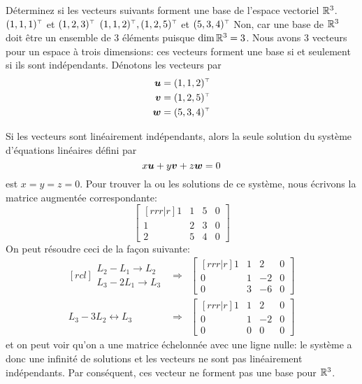 \begin{exemple}
Déterminez si les vecteurs suivants forment une base de l'espace vectoriel $\mathbb{R}^3$.
 $\transp{(1, 1, 1)}$ et $\transp{(1, 2, 3)}$
 $\transp{(1, 1, 2)}, \transp{(1, 2, 5)}$ et $\transp{(5, 3, 4)}$
\solution
{} Non, car une base de $\mathbb{R}^3$ doit être un ensemble de 3 éléments puisque $\dim\mathbb{R}^3 = 3$.
Nous avons 3 vecteurs pour un espace à trois dimensions: 
ces vecteurs forment une base si et seulement si ils sont indépendants.  
Dénotons les vecteurs par 
\begin{eqnarray*}
\mat{u} =  \transp{(1, 1, 2)}\\
\mat{v} =  \transp{(1, 2, 5)}\\
\mat{w} =  \transp{(5, 3, 4)}
\end{eqnarray*}

Si les vecteurs sont linéairement indépendants, alors la seule solution du système d'équations linéaires défini par
\[
x\boldsymbol{u} + y\boldsymbol{v} + z\boldsymbol{w} = 0
\]
est $x=y=z=0$.  Pour trouver la ou les solutions de ce système, nous écrivons la matrice augmentée correspondante:
	\[
	\begin{bmatrix}[rrr|r]
		1 &1& 5 & 0\\
		1 &2& 3& 0\\
		2 & 5 & 4 & 0
	\end{bmatrix}
	\]
On peut résoudre ceci de la façon suivante:
\[
\begin{matrix}[rcl]
\begin{matrix}
L_2 - L_1 \rightarrow L_2 \\
L_3 -2L_1 \rightarrow L_3
\end{matrix}& \Rightarrow& \begin{bmatrix}[rrr|r]
		1 &1& 2 & 0\\
		0 &1& -2& 0\\
		0 & 3 & -6 & 0
	\end{bmatrix} \\[25pt]
L_3 - 3 L_2 \leftrightarrow L_3
&\Rightarrow&
\begin{bmatrix}[rrr|r]
		1 &1& 2 & 0\\
		0 &1& -2& 0\\
		0 & 0 & 0 & 0
	\end{bmatrix}
\end{matrix}
\]	
et on peut voir qu'on a une matrice échelonnée avec une
ligne nulle: le système a donc une infinité de solutions
et les vecteurs ne sont pas linéairement indépendants. 
Par conséquent, ces vecteur ne forment pas une base
pour $\mathbb{R}^3$.


\end{exemple}
